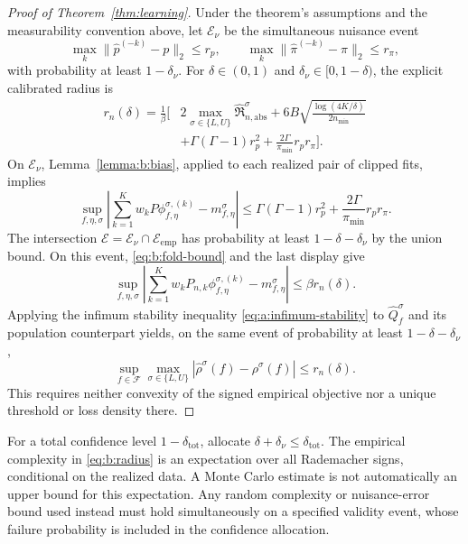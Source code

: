 \begin{proof}[Proof of Theorem~\ref{thm:learning}]
Under the theorem's assumptions and the measurability convention above,
let $\mathcal E_\nu$ be the simultaneous nuisance event
\begin{equation}
 \max_k\|\widehat p^{(-k)}-p\|_2\leq r_p,\qquad
 \max_k\|\widehat\pi^{(-k)}-\pi\|_2\leq r_\pi,
 \label{eq:b:nuisance-event}
\end{equation}
with probability at least $1-\delta_\nu$. For
$\delta\in(0,1)$ and $\delta_\nu\in[0,1-\delta)$, the
explicit calibrated radius is
\begin{equation}
 \begin{aligned}
 r_n(\delta)=\frac1\beta\Bigg[
 &2\max_{\sigma\in\{L,U\}}\widehat{\mathfrak R}_{n,\mathrm{abs}}^\sigma
 +6B\sqrt{\frac{\log(4K/\delta)}{2n_{\min}}}\\
 &+\Gamma(\Gamma-1)r_p^2
 +\frac{2\Gamma}{\pi_{\min}}r_pr_\pi\Bigg].
 \end{aligned}
 \label{eq:b:radius}
\end{equation}
On $\mathcal E_\nu$, Lemma~\ref{lemma:b:bias}, applied to each realized
pair of clipped fits, implies
\[
 \sup_{f,\eta,\sigma}\left|
 \sum_{k=1}^K w_kP\phi^{\sigma,(k)}_{f,\eta}
 -m^\sigma_{f,\eta}\right|
 \leq\Gamma(\Gamma-1)r_p^2+\frac{2\Gamma}{\pi_{\min}}r_pr_\pi.
\]
The intersection $\mathcal E=\mathcal E_\nu\cap\mathcal E_{\mathrm{emp}}$
has probability at least $1-\delta-\delta_\nu$ by the union bound.
On this event, \eqref{eq:b:fold-bound} and the last display give
\[
 \sup_{f,\eta,\sigma}\left|
 \sum_{k=1}^K w_kP_{n,k}\phi^{\sigma,(k)}_{f,\eta}
 -m^\sigma_{f,\eta}\right|\leq\beta r_n(\delta).
\]
Applying the infimum stability inequality \eqref{eq:a:infimum-stability}
to $\widehat Q_f^\sigma$ and its population counterpart yields, on the same
event of probability at least $1-\delta-\delta_\nu$,
\begin{equation}
 \sup_{f\in\mathcal F}\max_{\sigma\in\{L,U\}}
 |\widehat\rho^\sigma(f)-\rho^\sigma(f)|\leq r_n(\delta).
 \label{eq:b:uniform-endpoints}
\end{equation}
This requires neither convexity of the signed empirical objective nor a
unique threshold or loss density there.
\end{proof}

For a total confidence level $1-\delta_{\mathrm{tot}}$, allocate
$\delta+\delta_\nu\leq\delta_{\mathrm{tot}}$. The empirical complexity in
\eqref{eq:b:radius} is an expectation over all Rademacher signs, conditional
on the realized data. A Monte Carlo estimate is not automatically an upper
bound for this expectation. Any random complexity or nuisance-error bound
used instead must hold simultaneously on a specified validity event, whose
failure probability is included in the confidence allocation.

